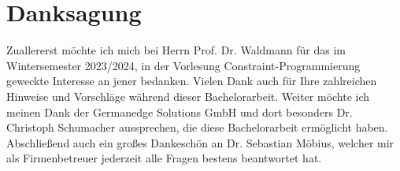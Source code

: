 \chapter*{Danksagung}
\label{chapter:Danksagung}

Zuallererst möchte ich mich bei Herrn Prof. Dr. Waldmann für das im Wintersemester 2023/2024,
in der Vorlesung Constraint-Programmierung geweckte Interesse an jener bedanken.
Vielen Dank auch für Ihre zahlreichen Hinweise und Vorschläge während dieser Bachelorarbeit.
Weiter möchte ich meinen Dank der Germanedge Solutions GmbH und dort besonders Dr. Christoph Schumacher aussprechen,
die diese Bachelorarbeit ermöglicht haben.
Abschließend auch ein großes Dankeschön an Dr. Sebastian Möbius, welcher mir als Firmenbetreuer jederzeit alle
Fragen bestens beantwortet hat.